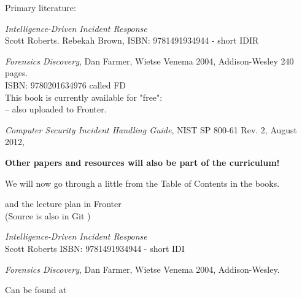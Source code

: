 \documentclass[Screen16to9,17pt]{foils}
\begin{document}

Primary literature:
\begin{list2}
\item \emph{Intelligence-Driven Incident Response} \\
 Scott Roberts. Rebekah Brown, ISBN: 9781491934944 - short IDIR

\item \emph{Forensics Discovery}, Dan Farmer, Wietse Venema 2004, Addison-Wesley 240 pages.\\
ISBN: 9780201634976 called FD\\
This book is currently available for "free":\\
 -- also uploaded to Fronter.

\item \emph{
Computer Security Incident Handling Guide}, NIST SP 800-61 Rev. 2, August 2012,\\
\end{list2}

{\bf Other papers and resources will also be part of the curriculum!}


We will now go through a little from the Table of Contents in the books.

and the lecture plan in Fronter\\
(Source is also in Git  )



\emph{Intelligence-Driven Incident Response} \\
 Scott Roberts ISBN: 9781491934944 - short IDI





\emph{Forensics Discovery}, Dan Farmer, Wietse Venema 2004, Addison-Wesley.

Can be found at 


\end{document}
